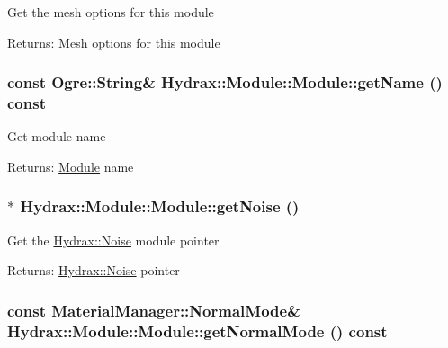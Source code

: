 Get the mesh options for this module \begin{Desc}
\item[Returns:]\hyperlink{class_hydrax_1_1_mesh}{Mesh} options for this module \end{Desc}
\hypertarget{class_hydrax_1_1_module_1_1_module_f00dbb4fcb83e45e89c7d537860ee486}{
\subsubsection[{getName}]{\setlength{\rightskip}{0pt plus 5cm}const Ogre::String\& Hydrax::Module::Module::getName () const}}
\label{class_hydrax_1_1_module_1_1_module_f00dbb4fcb83e45e89c7d537860ee486}


Get module name \begin{Desc}
\item[Returns:]\hyperlink{class_hydrax_1_1_module_1_1_module}{Module} name \end{Desc}
\hypertarget{class_hydrax_1_1_module_1_1_module_e16db579f543cb24fdb7fcc909ee94cf}{
\subsubsection[{getNoise}]{$\ast$ Hydrax::Module::Module::getNoise ()}}
\label{class_hydrax_1_1_module_1_1_module_e16db579f543cb24fdb7fcc909ee94cf}


Get the \hyperlink{namespace_hydrax_1_1_noise}{Hydrax::Noise} module pointer \begin{Desc}
\item[Returns:]\hyperlink{namespace_hydrax_1_1_noise}{Hydrax::Noise} pointer \end{Desc}
\hypertarget{class_hydrax_1_1_module_1_1_module_f5cfbabb783d9ded22f30f779c83c1c4}{
\subsubsection[{getNormalMode}]{\setlength{\rightskip}{0pt plus 5cm}const {\bf MaterialManager::NormalMode}\& Hydrax::Module::Module::getNormalMode () const}}
\label{class_hydrax_1_1_module_1_1_module_f5cfbabb783d9ded22f30f779c83c1c4}


